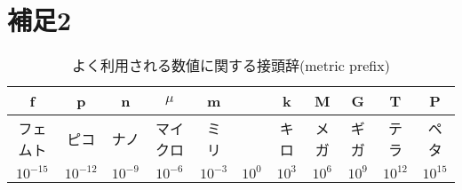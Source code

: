 \documentclass[10pt,a4j]{jbook}
\begin{document}
\section{補足2}
\begin{table}[h]
\begin{center}
\caption{よく利用される数値に関する接頭辞(metric prefix)}
\label{tbl:prefix}
\begin{tabular}{c|c|c|c|c|c|c|c|c|c|c}
f & p & n & $\mu$ & m & & k & M & G & T & P \\
\hline
フェムト & ピコ& ナノ & マイクロ & ミリ & & キロ & メガ& ギガ& テラ & ペタ\\
\hline
$10^{-15}$ &
$10^{-12}$&
$10^{-9}$ &
$10^{-6}$ &
$10^{-3}$ &
$10^0$ &
$10^3$ &
$10^6$ &
$10^9$ &
$10^{12}$&
$10^{15}$ 
\end{tabular}
\end{center}
\end{table}
\end{document}
